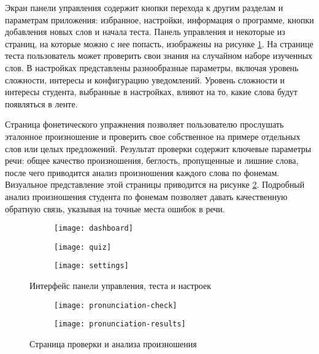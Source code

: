 Экран панели управления содержит кнопки перехода к другим разделам и параметрам приложения: избранное, настройки, информация о программе, кнопки добавления новых слов и начала теста. Панель управления и некоторые из страниц, на которые можно с нее попасть, изображены на рисунке \ref{fig:dashboard}. На странице теста пользователь может проверить свои знания на случайном наборе изученных слов. В настройках представлены разнообразные параметры, включая уровень сложности, интересы и конфигурацию уведомлений. Уровень сложности и интересы студента, выбранные в настройках, влияют на то, какие слова будут появляться в ленте.

Страница фонетического упражнения позволяет пользователю прослушать эталонное произношение и проверить свое собственное на примере отдельных слов или целых предложений. Результат проверки содержит ключевые параметры речи: общее качество произношения, беглость, пропущенные и лишние слова, после чего приводится анализ произношения каждого слова по фонемам. Визуальное представление этой страницы приводится на рисунке \ref{fig:pronunciation-check}. Подробный анализ произношения студента по фонемам позволяет давать качественную обратную связь, указывая на точные места ошибок в речи.

\begin{figure}[H]
	\centering
	\begin{subfigure}{0.3\textwidth}
		\centering
		\texttt{[image: dashboard]}
	\end{subfigure}
	\begin{subfigure}{0.3\textwidth}
		\centering
		\texttt{[image: quiz]}
	\end{subfigure}
	\begin{subfigure}{0.3\textwidth}
		\centering
		\texttt{[image: settings]}
	\end{subfigure}
	\caption{Интерфейс панели управления, теста и настроек}
	\label{fig:dashboard}
\end{figure}

\begin{figure}[H]
	\centering
	\begin{subfigure}{0.3\textwidth}
		\centering
		\texttt{[image: pronunciation-check]}
	\end{subfigure}
	\hspace{0.2\textwidth}
	\begin{subfigure}{0.3\textwidth}
		\centering
		\texttt{[image: pronunciation-results]}
	\end{subfigure}
	\caption{Страница проверки и анализа произношения}
	\label{fig:pronunciation-check}
\end{figure}

